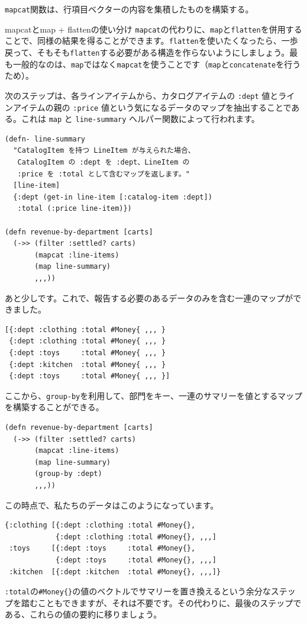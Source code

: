 \texttt{mapcat}関数は、行項目ベクターの内容を集積したものを構築する。

\begin{itembox}[l]{mapcatとmap + flattenの使い分け}
\texttt{mapcat}の代わりに、\texttt{map}と\texttt{flatten}を併用することで、同様の結果を得ることができます。\texttt{flatten}を使いたくなったら、一歩戻って、そもそも\texttt{flatten}する必要がある構造を作らないようにしましょう。最も一般的なのは、\texttt{map}ではなく\texttt{mapcat}を使うことです（\texttt{map}と\texttt{concatenate}を行うため）。
\end{itembox}

次のステップは、各ラインアイテムから、カタログアイテムの \texttt{:dept} 値とラインアイテムの親の \texttt{:price} 値という気になるデータのマップを抽出することである。これは \texttt{map} と \texttt{line-summary} ヘルパー関数によって行われます。



\begin{lstlisting}[numbers=none]
(defn- line-summary
  "CatalogItem を持つ LineItem が与えられた場合、
   CatalogItem の :dept を :dept、LineItem の 
   :price を :total として含むマップを返します。"
  [line-item]
  {:dept (get-in line-item [:catalog-item :dept])
   :total (:price line-item)})

(defn revenue-by-department [carts]
  (->> (filter :settled? carts)
       (mapcat :line-items)
       (map line-summary)
       ,,,))
\end{lstlisting}

あと少しです。これで、報告する必要のあるデータのみを含む一連のマップができました。


\begin{lstlisting}[numbers=none]
[{:dept :clothing :total #Money{ ,,, }
 {:dept :clothing :total #Money{ ,,, }
 {:dept :toys     :total #Money{ ,,, }
 {:dept :kitchen  :total #Money{ ,,, }
 {:dept :toys     :total #Money{ ,,, }]
\end{lstlisting}

ここから、\texttt{group-by}を利用して、部門をキー、一連のサマリーを値とするマップを構築することができる。


\begin{lstlisting}[numbers=none]
(defn revenue-by-department [carts]
  (->> (filter :settled? carts)
       (mapcat :line-items)
       (map line-summary)
       (group-by :dept)
       ,,,))
\end{lstlisting}

この時点で、私たちのデータはこのようになっています。


\begin{lstlisting}[numbers=none]
{:clothing [{:dept :clothing :total #Money{},
            {:dept :clothing :total #Money{}, ,,,]
 :toys     [{:dept :toys     :total #Money{},
            {:dept :toys     :total #Money{}, ,,,]
 :kitchen  [{:dept :kitchen  :total #Money{}, ,,,]}
\end{lstlisting}

\texttt{:total}の\texttt{\#Money\{\}}の値のベクトルでサマリーを置き換えるという余分なステップを踏むこともできますが、それは不要です。その代わりに、最後のステップである、これらの値の要約に移りましょう。

